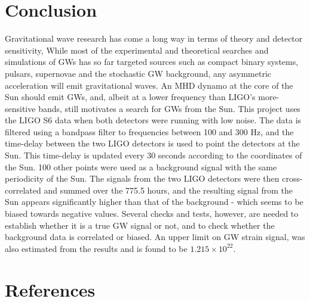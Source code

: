 \documentclass[12pt,helvetica,a4paper,final]{iopart}
\begin{document}
\section{Conclusion}
Gravitational wave research has come a long way in terms of theory and detector sensitivity, While most of the experimental and theoretical searches and simulations of GWs has so far targeted sources such as compact binary systems, pulsars, supernovae and the stochastic GW background, any asymmetric acceleration will emit gravitational waves. An MHD dynamo at the core of the Sun should emit GWs, and, albeit at a lower frequency than LIGO's more-sensitive bands, still motivates a search for GWs from the Sun. This project uses the LIGO S6 data when both detectors were running with low noise. The data is filtered using a bandpass filter to frequencies between 100 and 300 Hz, and the time-delay between the two LIGO detectors is used to point the detectors at the Sun. This time-delay is updated every 30 seconds according to the coordinates of the Sun. 100 other points were used as a background signal with the same periodicity of the Sun. The signals from the two LIGO detectors were then cross-correlated and summed over the 775.5 hours, and the resulting signal from the Sun appears significantly higher than that of the background - which seems to be biased towards negative values. Several checks and tests, however, are needed to establish whether it is a true GW signal or not, and to check whether the background data is correlated or biased. An upper limit on GW strain signal, was also estimated from the results and is found to be $1.215 \times 10^{22}$.
\section*{References}%
\begin{flushleft}


\end{flushleft}
\end{document}
